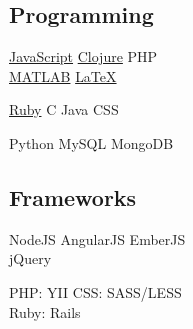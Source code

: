 \documentclass[letterpaper]{deedy-resume} %
\begin{document}
\begin{minipage}[t]{0.33\textwidth}
\subsection{Programming}

\href{http://github.com/charlespwd/mcgill-minerva-api}{JavaScript}
\textbullet{}
\href{http://github.com/charlespwd/bestcase}{Clojure}
\textbullet{}
PHP \\
\href{http://github.com/charlespwd/suture.m}{MATLAB}
\textbullet{}
\href{http://github.com/charlespwd/tex-base}{\LaTeX} \\

\insectionspace

\href{http://github.com/charlespwd/grocery-list}{Ruby}
\textbullet{} C \textbullet{} Java \textbullet{} CSS

\insectionspace

Python \textbullet{} MySQL \textbullet{} MongoDB

\sectionspace %

\subsection{Frameworks}

NodeJS \textbullet{} AngularJS \textbullet{} EmberJS \\
jQuery \\

\insectionspace

PHP: YII \textbullet{} CSS: SASS/LESS \textbullet{} \\
Ruby: Rails

\sectionspace


\end{minipage} %
\hfill
%
%
\end{document}
